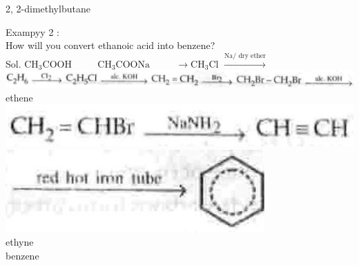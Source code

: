 \documentclass[10pt]{article}
\begin{document}
2, 2-dimethylbutane

Exampyy 2 :\\
How will you convert ethanoic acid into benzene?\\
Sol. $\mathrm{CH}_{3} \mathrm{COOH}$ $\qquad$ $\mathrm{CH}_{3} \mathrm{COONa}$ $\qquad$ $\rightarrow \mathrm{CH}_{3} \mathrm{Cl}$ $\xrightarrow{\mathrm{Na} / \text { dry } \mathrm{ether}}$\\
\includegraphics[max width=\textwidth]{2025_01_28_8470952b98110cec3aabg-218(1)} ethene\\
\includegraphics[max width=\textwidth, center]{2025_01_28_8470952b98110cec3aabg-218}\\
\includegraphics[max width=\textwidth, center]{2025_01_28_8470952b98110cec3aabg-218(3)}\\
ethyne\\
benzene
\end{document}
